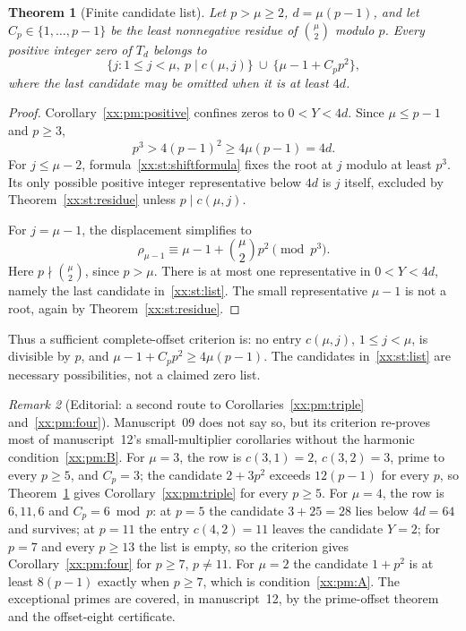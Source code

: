 \documentclass[11pt,a4paper]{article}
\numberwithin{equation}{section}
\newtheorem{theorem}{Theorem}[section]
\theoremstyle{definition}
\theoremstyle{remark}
\newtheorem{remark}[theorem]{Remark}
\theoremstyle{plain}
\begin{document}
\begin{theorem}[Finite candidate list]\label{xx:st:candidates}
Let $p>\mu\ge2$, $d=\mu(p-1)$, and let $C_p\in\{1,\ldots,p-1\}$ be the least
nonnegative residue of $\binom\mu2$ modulo $p$. Every positive integer zero of
$T_d$ belongs to
\begin{equation}\label{xx:st:list}
 \{j:1\le j<\mu,\ p\mid c(\mu,j)\}
 \ \cup\ \{\mu-1+C_pp^2\},
\end{equation}
where the last candidate may be omitted when it is at least $4d$.
\end{theorem}
\begin{proof}
Corollary~\ref{xx:pm:positive} confines zeros to $0<Y<4d$. Since $\mu\le p-1$
and $p\ge3$,
\[
 p^3>4(p-1)^2\ge4\mu(p-1)=4d.
\]
For $j\le\mu-2$, formula~\eqref{xx:st:shiftformula} fixes the root at $j$
modulo at least $p^3$. Its only possible positive integer representative below
$4d$ is $j$ itself, excluded by Theorem~\ref{xx:st:residue} unless
$p\mid c(\mu,j)$.

For $j=\mu-1$, the displacement simplifies to
\[
 \rho_{\mu-1}\equiv \mu-1+\binom\mu2p^2\pmod{p^3}.
\]
Here $p\nmid\binom\mu2$, since $p>\mu$. There is at most one representative in
$0<Y<4d$, namely the last candidate in~\eqref{xx:st:list}. The small
representative $\mu-1$ is not a root, again by Theorem~\ref{xx:st:residue}.
\end{proof}

Thus a sufficient complete-offset criterion is: no entry $c(\mu,j)$,
$1\le j<\mu$, is divisible by $p$, and $\mu-1+C_pp^2\ge4\mu(p-1)$. The
candidates in~\eqref{xx:st:list} are necessary possibilities, not a claimed zero
list.

\begin{remark}[Editorial: a second route to Corollaries~\ref{xx:pm:triple} and~\ref{xx:pm:four}]\label{xx:lc:rem:second-route}
Manuscript~09 does not say so, but its criterion re-proves most of manuscript~12's
small-multiplier corollaries without the harmonic condition~\eqref{xx:pm:B}.
For $\mu=3$, the row is $c(3,1)=2$, $c(3,2)=3$, prime to every $p\ge5$, and
$C_p=3$; the candidate $2+3p^2$ exceeds $12(p-1)$ for every $p$, so
Theorem~\ref{xx:st:candidates} gives Corollary~\ref{xx:pm:triple} for every
$p\ge5$.  For $\mu=4$, the row is $6,11,6$ and $C_p=6\bmod p$: at $p=5$ the
candidate $3+25=28$ lies below $4d=64$ and survives; at $p=11$ the entry
$c(4,2)=11$ leaves the candidate $Y=2$; for $p=7$ and every $p\ge13$ the list is
empty, so the criterion gives Corollary~\ref{xx:pm:four} for $p\ge7$, $p\ne11$.
For $\mu=2$ the candidate $1+p^2$ is at least $8(p-1)$ exactly when $p\ge7$,
which is condition~\eqref{xx:pm:A}.  The exceptional primes are covered, in
manuscript~12, by the prime-offset theorem and the offset-eight certificate.
\end{remark}
\end{document}
